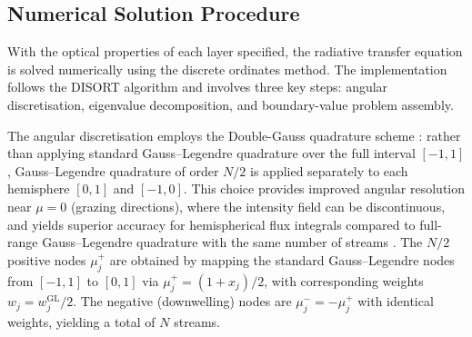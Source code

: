 \documentclass[a4paper, 11pt]{article}
\begin{document}
\subsection{Numerical Solution Procedure}
\label{sec:numerical}

With the optical properties of each layer specified, the radiative
transfer equation is solved numerically using the discrete ordinates
method.  The implementation follows the DISORT algorithm
\cite{stamnes1988,disortreport} and involves three key steps: angular
discretisation, eigenvalue decomposition, and boundary-value problem
assembly.

The angular discretisation employs the Double-Gauss quadrature scheme
\cite{sykes1951,disortreport}: rather than applying standard
Gauss--Legendre quadrature over the full
interval $[-1, 1]$, Gauss--Legendre quadrature of
order $N/2$ is applied separately to each hemisphere $[0,1]$ and
$[-1,0]$.  This choice provides improved angular resolution near
$\mu = 0$ (grazing directions), where the intensity field can be
discontinuous, and yields superior accuracy for hemispherical flux
integrals compared to full-range Gauss--Legendre quadrature with the
same number of streams \cite{disortreport}.  The $N/2$ positive nodes $\mu_j^+$ are obtained by mapping the
standard Gauss--Legendre nodes from $[-1,1]$ to $[0,1]$ via
$\mu_j^+ = (1+x_j)/2$, with corresponding weights $w_j = w_j^{\text{GL}}/2$.
The negative (downwelling) nodes are $\mu_j^- = -\mu_j^+$ with identical
weights, yielding a total of $N$ streams.
\end{document}

